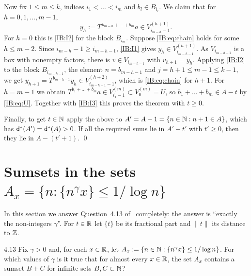 Now fix $1\le m\le k$, indices $i_1<\dots<i_m$ and $b_l\in B_{i_l}$. We claim that for
$h=0,1,\dots,m-1$,
\begin{equation}\label{IB:eq:chain}
y_h:=T^{\,b_{m-h}+\dots+b_m}a\in V^{(h+1)}_{i_{m-h}-1}.
\end{equation}
For $h=0$ this is \ref{IB:I2} for the block $B_{i_m}$. Suppose \eqref{IB:eq:chain}
holds for some $h\le m-2$. Since $i_{m-h}-1\ge i_{m-h-1}$, \ref{IB:I1} gives
$y_h\in V^{(h+1)}_{i_{m-h-1}}$. As $V_{i_{m-h-1}}$ is a box with nonempty factors, there
is $v\in V_{i_{m-h-1}}$ with $v_{h+1}=y_h$. Applying \ref{IB:I2} to the block
$B_{i_{m-h-1}}$, the element $n=b_{m-h-1}$ and $j=h+1\le m-1\le k-1$, we get
$y_{h+1}=T^{b_{m-h-1}}y_h\in V^{(h+2)}_{i_{m-h-1}-1}$, which is \eqref{IB:eq:chain} for $h+1$.
For $h=m-1$ we obtain $T^{b_1+\dots+b_m}a\in V^{(m)}_{i_1-1}\subset V^{(m)}_0=U$, so
$b_1+\dots+b_m\in A-t$ by \eqref{IB:eq:U}. Together with \ref{IB:I3} this proves the
theorem with $t\ge0$.

Finally, to get $t\in\mathbb{N}$ apply the above to $A'=A-1=\{n\in\mathbb{N}:n+1\in A\}$, which has
$\mathsf{d}^*(A')=\mathsf{d}^*(A)>0$. If all the required sums lie in $A'-t'$ with $t'\ge0$, then
they lie in $A-(t'+1)$. \qed


\section{Sumsets in the sets \texorpdfstring{$A_x=\{n:\{n^\gamma x\}\le 1/\log n\}$}{A\_x}}
\label{IB:sec:q413}

In this section we answer Question~4.13 of~\cite{kra2023problems} completely: the
answer is ``exactly the non-integers $\gamma$''. For $t\in\mathbb{R}$ let $\{t\}$ be its
fractional part and $\|t\|$ its distance to $\mathbb{Z}$.

\begin{question}{4.13}
\label{IB:q:413}
Fix $\gamma>0$ and, for each $x\in\mathbb{R}$, let
$A_x:=\{n\in\mathbb{N}:\{n^\gamma x\}\le1/\log n\}$. For which values of $\gamma$ is it true
that for almost every $x\in\mathbb{R}$, the set $A_x$ contains a sumset $B+C$ for
infinite sets $B,C\subset\mathbb{N}$?
\end{question}

